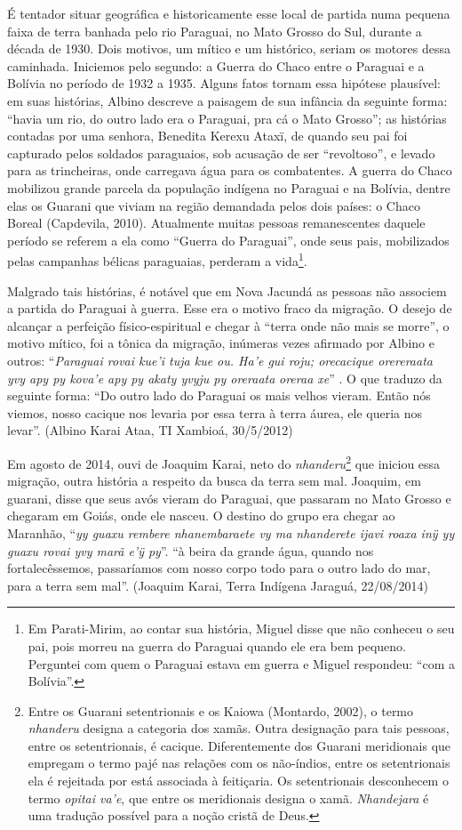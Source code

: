 É tentador situar geográfica e historicamente esse local de partida numa
pequena faixa de terra banhada pelo rio Paraguai, no Mato Grosso do Sul,
durante a década de 1930. Dois motivos, um mítico e um histórico, seriam
os motores dessa caminhada. Iniciemos pelo segundo: a Guerra do Chaco
entre o Paraguai e a Bolívia no período de 1932 a 1935. Alguns fatos
tornam essa hipótese plausível: em suas histórias, Albino descreve a
paisagem de sua infância da seguinte forma: ``havia um rio, do outro
lado era o Paraguai, pra cá o Mato Grosso''; as histórias contadas por
uma senhora, Benedita Kerexu Ataxï, de quando seu pai foi capturado
pelos soldados paraguaios, sob acusação de ser ``revoltoso'', e levado
para as trincheiras, onde carregava água para os combatentes. A guerra
do Chaco mobilizou grande parcela da população indígena no Paraguai e na
Bolívia, dentre elas os Guarani que viviam na região demandada pelos
dois países: o Chaco Boreal (Capdevila, 2010). Atualmente muitas pessoas
remanescentes daquele período se referem a ela como ``Guerra do
Paraguai'', onde seus pais, mobilizados pelas campanhas bélicas
paraguaias, perderam a vida\footnote{Em Parati-Mirim, ao contar sua
  história, Miguel disse que não conheceu o seu pai, pois morreu na
  guerra do Paraguai quando ele era bem pequeno. Perguntei com quem o
  Paraguai estava em guerra e Miguel respondeu: ``com a Bolívia''.}.

Malgrado tais histórias, é notável que em Nova Jacundá as pessoas não
associem a partida do Paraguai à guerra. Esse era o motivo fraco da
migração. O desejo de alcançar a perfeição físico-espiritual e chegar à
``terra onde não mais se morre'', o motivo mítico, foi a tônica da
migração, inúmeras vezes afirmado por Albino e outros: ``\emph{Paraguai
rovai kue'i tuja kue ou. Ha'e gui roju; orecacique orereraata yvy apy py
kova'e apy py akaty yvyju py oreraata} \emph{oreraa xe}'' . O que
traduzo da seguinte forma: ``Do outro lado do Paraguai os mais velhos
vieram. Então nós viemos, nosso cacique nos levaria por essa terra à
terra áurea, ele queria nos levar''. (Albino Karai Ataa, TI Xambioá,
30/5/2012)

Em agosto de 2014, ouvi de Joaquim Karai, neto do
\emph{nhanderu}\footnote{Entre os Guarani setentrionais e os Kaiowa
  (Montardo, 2002), o termo \emph{nhanderu} designa a categoria dos
  xamãs. Outra designação para tais pessoas, entre os setentrionais, é
  cacique. Diferentemente dos Guarani meridionais que empregam o termo
  pajé nas relações com os não-índios, entre os setentrionais ela é
  rejeitada por está associada à feitiçaria. Os setentrionais
  desconhecem o termo \emph{opitai va'e}, que entre os meridionais
  designa o xamã. \emph{Nhandejara} é uma tradução possível para a noção
  cristã de Deus.} que iniciou essa migração, outra história a respeito
da busca da terra sem mal. Joaquim, em guarani, disse que seus avós
vieram do Paraguai, que passaram no Mato Grosso e chegaram em Goiás,
onde ele nasceu. O destino do grupo era chegar ao Maranhão, ``\emph{yy
guaxu rembere nhanembaraete vy ma nhanderete ijavi roaxa inÿ yy guaxu
rovai yvy marã e'ÿ py}''. ``à beira da grande água, quando nos
fortalecêssemos, passaríamos com nosso corpo todo para o outro lado do
mar, para a terra sem mal''. (Joaquim Karai, Terra Indígena Jaraguá,
22/08/2014)

